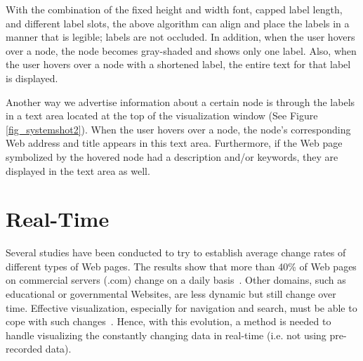 \documentclass[]{article}
\begin{document}
{With the combination of the fixed height and width font, capped label length, and different label slots, the above algorithm can align and place the labels in a manner that is legible; labels are not occluded.
In addition, when the user hovers over a node, the node becomes gray-shaded and shows only one label.
Also, when the user hovers over a node with a shortened label, the entire text for that label is displayed.

Another way we advertise information about a certain node is through the labels in a text area located at the top of the visualization window (See Figure \ref{fig_systemshot2}).
When the user hovers over a node, the node's corresponding Web address and title appears in this text area.
Furthermore, if the Web page symbolized by the hovered node had a description and/or keywords, they are displayed in the text area as well.

\section{Real-Time}
\label{se:real-time}

Several studies have been conducted to try to establish average change rates of different types of Web pages.
The results show that more than 40\% of Web pages on commercial servers (.com) change on a daily basis~\cite{cg00}.
Other domains, such as educational or governmental Websites, are less dynamic but still change over time.
Effective visualization, especially for navigation and search, must be able to cope with such changes~\cite{atlas}.
Hence, with this evolution, a method is needed to handle visualizing the constantly changing data in real-time (i.e. not using pre-recorded data).


}
\end{document}
